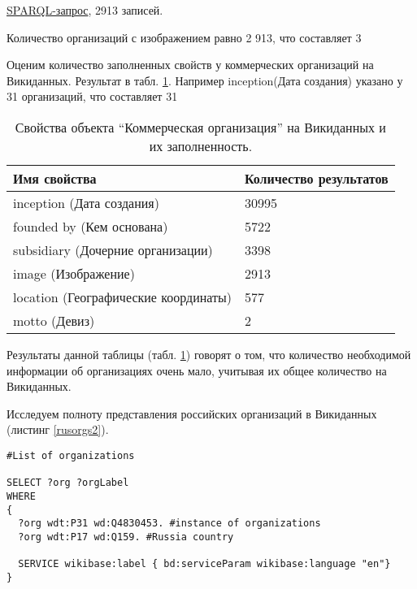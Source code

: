 \href{https://query.wikidata.org/#%23List%20of%20organisations%20%0A%0ASELECT%20%3Forg%20%3ForgLabel%20%3Fimage%0AWHERE%0A%7B%0A%20%20%3Forg%20wdt%3AP31%20wd%3AQ4830453.%20%23instance%20of%20orgs%0A%20%20%3Forg%20wdt%3AP18%20%3Fimage%0A%20%20%0A%0A%20%20SERVICE%20wikibase%3Alabel%20%7B%20bd%3AserviceParam%20wikibase%3Alanguage%20%22en%22%7D%0A%7D}{SPARQL-запрос}, 2913 записей.

Количество организаций с изображением равно 2 913, что составляет 3%

Оценим количество заполненных свойств у коммерческих организаций на Викиданных. Результат в табл. \ref{wdqueries}. Например inception(Дата создания) указано у 31 организаций, что составляет 31%

\begin{table}[h]
\centering
\begin{tabular}{|l|l|}
\hline
\textbf{Имя свойства} & \textbf{Количество результатов} \\
\hline
inception (Дата создания) & 30995 \\	
\hline
founded by (Кем основана) & 5722 \\
\hline
subsidiary (Дочерние организации) & 3398 \\
\hline
image (Изображение) & 2913 \\
\hline
location (Географические координаты) & 577 \\
\hline
motto (Девиз) & 2 \\
\hline
\end{tabular}
\caption{Свойства объекта \enquote{Коммерческая организация} на Викиданных и их заполненность.}
\label{wdqueries}
\end{table}

Результаты данной таблицы (табл. \ref{wdqueries}) говорят о том, что количество необходимой информации об организациях очень мало, учитывая их общее количество на Викиданных. 

Исследуем полноту представления российских организаций в Викиданных (листинг \ref{rusorgs2}).

\begin{lstlisting}[language=SPARQL,label=rusorgs2,caption=Организации России]
#List of organizations 

SELECT ?org ?orgLabel
WHERE
{
  ?org wdt:P31 wd:Q4830453. #instance of organizations
  ?org wdt:P17 wd:Q159. #Russia country

  SERVICE wikibase:label { bd:serviceParam wikibase:language "en"}
}
\end{lstlisting}

